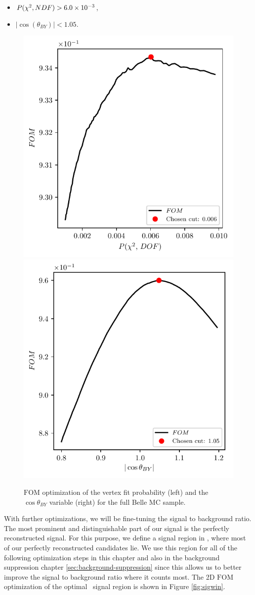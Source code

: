 \begin{itemize}
	\item $P(\chi^2,NDF) > 6.0\times 10^{-3}$,
	\item $\vert \cos \left(\theta_{BY}\right) \vert < 1.05$.
\end{itemize}

\begin{figure}[H]
	\centering
	\captionsetup{width=0.8\linewidth}
	\includegraphics[width=0.48\linewidth]{fig/VTX_precise}
	\includegraphics[width=0.48\linewidth]{fig/cosBY_precise}
	\caption{$\mathrm{FOM}$ optimization of the vertex fit probability (left) and the $\cos \theta_{BY}$ variable (right) for the full Belle MC sample.}
	\label{fig:preciseFOM}
\end{figure}

With further optimizations, we will be fine-tuning the signal to background ratio. The most prominent and distinguishable part of our signal is the perfectly reconstructed signal. For this purpose, we define a signal region in \vars, where most of our perfectly reconstructed candidates lie. We use this region for all of the following optimization steps in this chapter and also in the background suppression chapter \ref{sec:background-suppression} since this allows us to better improve the signal to background ratio where it counts most. The 2D $\mathrm{FOM}$ optimization of the optimal \vars~signal region is shown in Figure \ref{fig:sigwin}.

